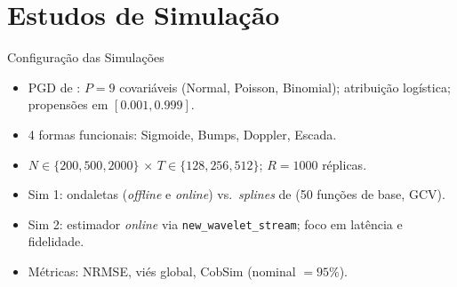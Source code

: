 \documentclass{beamer}
\begin{document}
\section{Estudos de Simulação}

\begin{frame}{Configuração das Simulações}
\begin{itemize}
    \item PGD de : \(P{=}9\) covariáveis (Normal, Poisson, Binomial); atribuição logística; propensões em \([0.001, 0.999]\).
    \item 4 formas funcionais: Sigmoide, Bumps, Doppler, Escada.
    \item \(N \in \{200, 500, 2000\}\) \(\times\) \(T \in \{128, 256, 512\}\); \(R = 1000\) réplicas.
    \medskip
    \item Sim 1: ondaletas (\textit{offline} e \textit{online}) vs.\ \textit{splines} de  (50 funções de base, GCV).
    \item Sim 2: estimador \textit{online} via \texttt{new\_wavelet\_stream}; foco em latência e fidelidade.
    \item Métricas: NRMSE, viés global, CobSim (nominal \(= 95\%\)).
\end{itemize}
\end{frame}
\end{document}
